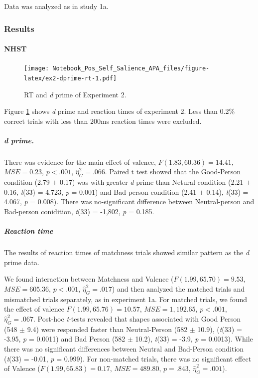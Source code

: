 \documentclass[
  english,
  man]{apa6}
\let\oldparagraph\paragraph
\renewcommand{\paragraph}[1]{\oldparagraph{#1}\mbox{}}
\let\oldsubparagraph\subparagraph
\renewcommand{\subparagraph}[1]{\oldsubparagraph{#1}\mbox{}}
\begin{document}
Data was analyzed as in study 1a.

\hypertarget{results-3}{%
\subsubsection{Results}\label{results-3}}

\hypertarget{nhst-1}{%
\paragraph{NHST}\label{nhst-1}}

\begin{figure}
\centering
\texttt{[image: Notebook\_Pos\_Self\_Salience\_APA\_files/figure-latex/ex2-dprime-rt-1.pdf]}
\caption{\label{fig:ex2-dprime-rt}RT and \emph{d} prime of Experiment 2.}
\end{figure}

Figure \ref{fig:ex2-dprime-rt} shows \emph{d} prime and reaction times of experiment 2. Less than 0.2\% correct trials with less than 200ms reaction times were excluded.

\hypertarget{d-prime.}{%
\subparagraph{d prime.}\label{d-prime.}}

There was evidence for the main effect of valence, \(F(1.83, 60.36) = 14.41\), \(\mathit{MSE} = 0.23\), \(p < .001\), \(\hat{\eta}^2_G = .066\). Paired t test showed that the Good-Person condition (2.79 \(\pm\) 0.17) was with greater \emph{d} prime than Netural condition (2.21 \(\pm\) 0.16, \emph{t}(33) = 4.723, \emph{p} = 0.001) and Bad-person condition (2.41 \(\pm\) 0.14), \emph{t}(33) = 4.067, \emph{p} = 0.008). There was no-significant difference between Neutral-person and Bad-person conidition, \emph{t}(33) = -1,802, \emph{p} = 0.185.

\hypertarget{reaction-time-2}{%
\subparagraph{Reaction time}\label{reaction-time-2}}

The results of reaction times of matchness trials showed similar pattern as the \emph{d} prime data.

We found interaction between Matchness and Valence (\(F(1.99, 65.70) = 9.53\), \(\mathit{MSE} = 605.36\), \(p < .001\), \(\hat{\eta}^2_G = .017\)) and then analyzed the matched trials and mismatched trials separately, as in experiment 1a. For matched trials, we found the effect of valence \(F(1.99, 65.76) = 10.57\), \(\mathit{MSE} = 1,192.65\), \(p < .001\), \(\hat{\eta}^2_G = .067\). Post-hoc \emph{t}-tests revealed that shapes associated with Good Person (548 \(\pm\) 9.4) were responded faster than Neutral-Person (582 \(\pm\) 10.9), (\emph{t}(33) = -3.95, \emph{p} = 0.0011) and Bad Person (582 \(\pm\) 10.2), \emph{t}(33) = -3.9, \emph{p} = 0.0013). While there was no significant differences between Neutral and Bad-Person condition (\emph{t}(33) = -0.01, \emph{p} = 0.999). For non-matched trials, there was no significant effect of Valence (\(F(1.99, 65.83) = 0.17\), \(\mathit{MSE} = 489.80\), \(p = .843\), \(\hat{\eta}^2_G = .001\)).
\end{document}
